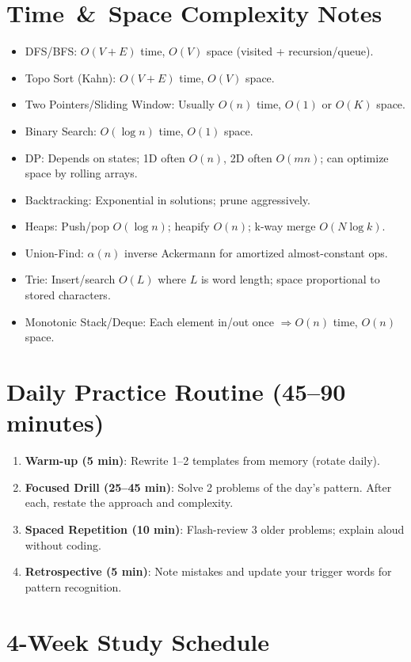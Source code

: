 \documentclass[11pt]{article}
\begin{document}
\section{Time \,\& \,Space Complexity Notes}
\begin{itemize}[leftmargin=1.2em]
  \item DFS/BFS: $O(V+E)$ time, $O(V)$ space (visited + recursion/queue).
  \item Topo Sort (Kahn): $O(V+E)$ time, $O(V)$ space.
  \item Two Pointers/Sliding Window: Usually $O(n)$ time, $O(1)$ or $O(K)$ space.
  \item Binary Search: $O(\log n)$ time, $O(1)$ space.
  \item DP: Depends on states; 1D often $O(n)$, 2D often $O(mn)$; can optimize space by rolling arrays.
  \item Backtracking: Exponential in solutions; prune aggressively.
  \item Heaps: Push/pop $O(\log n)$; heapify $O(n)$; k-way merge $O(N \log k)$.
  \item Union-Find: $\alpha(n)$ inverse Ackermann for amortized almost-constant ops.
  \item Trie: Insert/search $O(L)$ where $L$ is word length; space proportional to stored characters.
  \item Monotonic Stack/Deque: Each element in/out once $\Rightarrow O(n)$ time, $O(n)$ space.
\end{itemize}

\section{Daily Practice Routine (45--90 minutes)}
\begin{enumerate}[leftmargin=1.2em]
  \item \textbf{Warm-up (5 min)}: Rewrite 1--2 templates from memory (rotate daily).
  \item \textbf{Focused Drill (25--45 min)}: Solve 2 problems of the day's pattern. After each, restate the approach and complexity.
  \item \textbf{Spaced Repetition (10 min)}: Flash-review 3 older problems; explain aloud without coding.
  \item \textbf{Retrospective (5 min)}: Note mistakes and update your trigger words for pattern recognition.
\end{enumerate}

\section{4-Week Study Schedule}
\end{document}
